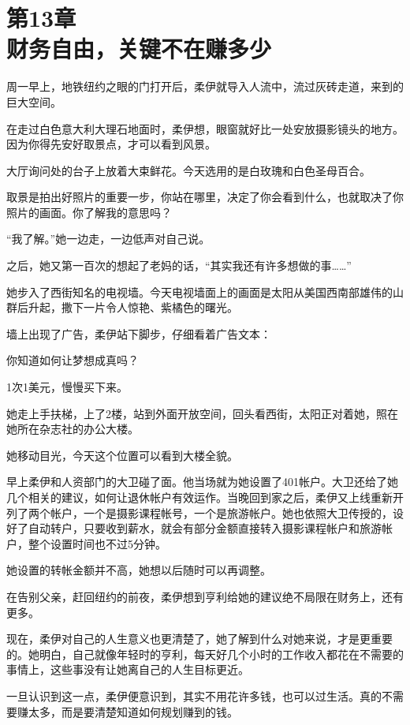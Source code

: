 \section[第13章\q 财务自由，关键不在赚多少]{第13章\\ 财务自由，关键不在赚多少}
\label{sec:ch13}

周一早上，地铁纽约之眼的门打开后，柔伊就导入人流中，流过灰砖走道，来到的巨大空间。

在走过白色意大利大理石地面时，柔伊想，眼窗就好比一处安放摄影镜头的地方。因为你得先安好取景点，才可以看到风景。

大厅询问处的台子上放着大束鲜花。今天选用的是白玫瑰和白色圣母百合。

{\kaishu 取景是拍出好照片的重要一步，你站在哪里，决定了你会看到什么，也就取决了你照片的画面。你了解我的意思吗？}

“我了解。”她一边走，一边低声对自己说。

之后，她又第一百次的想起了老妈的话，“其实我还有许多想做的事……”

她步入了西街知名的电视墙。今天电视墙面上的画面是太阳从美国西南部雄伟的山群后升起，撒下一片令人惊艳、紫橘色的曙光。

墙上出现了广告，柔伊站下脚步，仔细看着广告文本：

{\kaishu 你知道如何让梦想成真吗？}

{\kaishu 1次1美元，慢慢买下来。}

她走上手扶梯，上了2楼，站到外面开放空间，回头看西街，太阳正对着她，照在她所在杂志社的办公大楼。

她移动目光，今天这个位置可以看到大楼全貌。

早上柔伊和人资部门的大卫碰了面。他当场就为她设置了401帐户。大卫还给了她几个相关的建议，如何让退休帐户有效运作。当晚回到家之后，柔伊又上线重新开列了两个帐户，一个是摄影课程帐号，一个是旅游帐户。她也依照大卫传授的，设好了自动转户，只要收到薪水，就会有部分金额直接转入摄影课程帐户和旅游帐户，整个设置时间也不过5分钟。

她设置的转帐金额并不高，她想以后随时可以再调整。

在告别父亲，赶回纽约的前夜，柔伊想到亨利给她的建议绝不局限在财务上，还有更多。

现在，柔伊对自己的人生意义也更清楚了，她了解到什么对她来说，才是更重要的。她明白，自己就像年轻时的亨利，每天好几个小时的工作收入都花在不需要的事情上，这些事没有让她离自己的人生目标更近。

一旦认识到这一点，柔伊便意识到，其实不用花许多钱，也可以过生活。真的不需要赚太多，而是要清楚知道如何规划赚到的钱。

